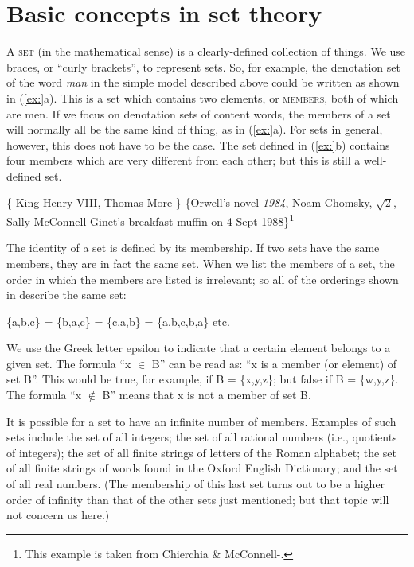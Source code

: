 \section{Basic concepts in set theory}\label{sec:} %

A \textsc{set} (in the mathematical sense) is a clearly-defined collection of things. We use braces, or “curly brackets”, to represent sets. So, for example, the denotation set of the word \textit{man} in the simple model described above could be written as shown in (\ref{ex:}a). This is a set which contains two elements, or \textsc{members}, both of which are men. If we focus on denotation sets of content words, the members of a set will normally all be the same kind of thing, as in (\ref{ex:}a). For sets in general, however, this does not have to be the case. The set defined in (\ref{ex:}b) contains four members which are very different from each other; but this is still a well-defined set.


\ea
\ea  \{ King Henry VIII, Thomas More \}
\ex  \{Orwell’s novel \textit{1984}, Noam Chomsky, $\sqrt{2}$, Sally McConnell-Ginet’s breakfast muffin on 4-Sept-1988\}\footnote{This example is taken from Chierchia \& McConnell-\citet[431]{Ginet1990}.}
\z
\z


The identity of a set is defined by its membership. If two sets have the same members, they are in fact the same set. When we list the members of a set, the order in which the members are listed is irrelevant; so all of the orderings shown in  describe the same set:


\ea
\{a,b,c\} = \{b,a,c\} = \{c,a,b\} = \{a,b,c,b,a\} etc. 
\z


We use the Greek letter epsilon to indicate that a certain element belongs to a given set. The formula “x ${\in}$ B” can be read as: “x is a member (or element) of set B”. This would be true, for example, if B = \{x,y,z\}; but false if B = \{w,y,z\}. The formula “x ${\notin}$ B” means that x is not a member of set B.



It is possible for a set to have an infinite number of members. Examples of such sets include the set of all integers; the set of all rational numbers (i.e., quotients of integers); the set of all finite strings of letters of the Roman alphabet; the set of all finite strings of words found in the Oxford English Dictionary; and the set of all real numbers. (The membership of this last set turns out to be a higher order of infinity than that of the other sets just mentioned; but that topic will not concern us here.)



